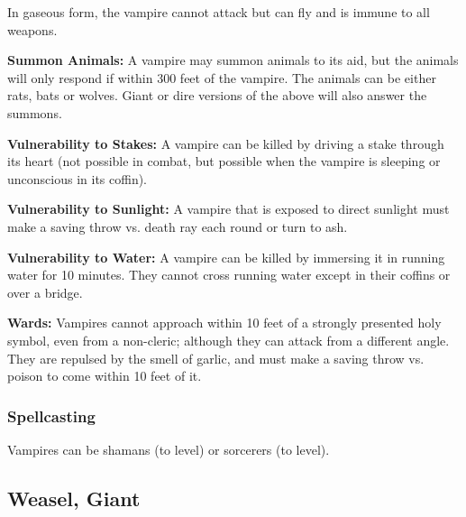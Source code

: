 \begin{multicols*}{2}
In gaseous form, the vampire cannot attack but can fly and is immune to all weapons.

\textbf{Summon Animals:} A vampire may summon animals to its aid, but the animals will only respond if within 300 feet of the vampire. The animals can be either rats, bats or wolves. Giant or dire versions of the above will also answer the summons.

\textbf{Vulnerability to Stakes:} A vampire can be killed by driving a stake through its heart (not possible in combat, but possible when the vampire is sleeping or unconscious in its coffin).

\textbf{Vulnerability to Sunlight:} A vampire that is exposed to direct sunlight must make a saving throw vs. death ray each round or turn to ash.

\textbf{Vulnerability to Water:} A vampire can be killed by immersing it in running water for 10 minutes. They cannot cross running water except in their coffins or over a bridge.

\textbf{Wards:} Vampires cannot approach within 10 feet of a strongly presented holy symbol, even from a non-cleric; although they can attack from a different angle. They are repulsed by the smell of garlic, and must make a saving throw vs. poison to come within 10 feet of it.

\subsubsection{Spellcasting}
Vampires can be shamans (to  level) or sorcerers (to  level).



\subsection{Weasel, Giant}
\end{multicols*}

